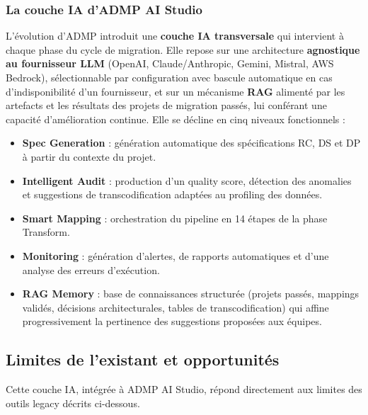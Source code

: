 \subsubsection{La couche IA d'ADMP AI Studio}
\label{subsubsec:ai-layer}

L'évolution d'ADMP introduit une \textbf{couche IA transversale} qui intervient
à chaque phase du cycle de migration. Elle repose sur une architecture
\textbf{agnostique au fournisseur LLM} (OpenAI, Claude/Anthropic, Gemini,
Mistral, AWS Bedrock), sélectionnable par configuration avec bascule automatique
en cas d'indisponibilité d'un fournisseur, et sur un mécanisme \textbf{RAG}
alimenté par les artefacts et les résultats des projets de migration passés, lui
conférant une capacité d'amélioration continue. Elle se décline en cinq niveaux
fonctionnels :

\begin{itemize}[leftmargin=*]
    \item \textbf{Spec Generation} : génération automatique des spécifications
    RC, DS et DP à partir du contexte du projet.
    \item \textbf{Intelligent Audit} : production d'un quality score, détection
    des anomalies et suggestions de transcodification adaptées au profiling des
    données.
    \item \textbf{Smart Mapping} : orchestration du pipeline en 14 étapes de la
    phase Transform.
    \item \textbf{Monitoring} : génération d'alertes, de rapports automatiques
    et d'une analyse des erreurs d'exécution.
    \item \textbf{RAG Memory} : base de connaissances structurée (projets passés,
    mappings validés, décisions architecturales, tables de transcodification) qui
    affine progressivement la pertinence des suggestions proposées aux équipes.
\end{itemize}

\subsection{Limites de l'existant et opportunités}
\label{subsec:limites-opportunites}

Cette couche IA, intégrée à ADMP AI Studio, répond directement aux limites des
outils legacy décrits ci-dessous.

